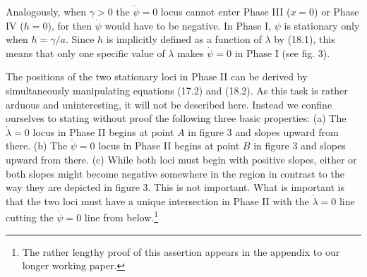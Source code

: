 \documentclass[11pt,fleqn]{article}
\begin{document}
Analogously, when $\gamma > 0$ the $\dot{\psi} = 0$ locus cannot enter Phase III ($x = 0$) or Phase IV ($h = 0$), for then $\dot{\psi}$ would have to be negative. In Phase I, $\psi$ is stationary only when $h = \gamma/a$. Since $h$ is implicitly defined as a function of $\lambda$ by (18.1), this means that only one specific value of $\lambda$ makes $\dot{\psi} = 0$ in Phase I (see fig. 3).

The positions of the two stationary loci in Phase II can be derived by simultaneously manipulating equations (17.2) and (18.2). As this task is rather arduous and uninteresting, it will not be described here. Instead we confine ourselves to stating without proof the following three basic properties: (a) The $\dot{\lambda} = 0$ locus in Phase II begins at point $A$ in figure 3 and slopes upward from there. (b) The $\dot{\psi} = 0$ locus in Phase II begins at point $B$ in figure 3 and slopes upward from there. (c) While both loci must begin with positive slopes, either or both slopes might become negative somewhere in the region in contrast to the way they are depicted in figure 3. This is not important. What is important is that the two loci must have a unique intersection in Phase II with the $\dot{\lambda} = 0$ line cutting the $\dot{\psi} = 0$ line from below.\footnote{The rather lengthy proof of this assertion appears in the appendix to our longer working paper.}
\end{document}
